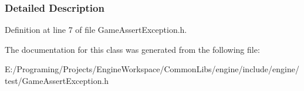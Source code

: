 \subsubsection{Detailed Description}


Definition at line 7 of file Game\+Assert\+Exception.\+h.



The documentation for this class was generated from the following file\+:\begin{DoxyCompactItemize}
\item 
E\+:/\+Programing/\+Projects/\+Engine\+Workspace/\+Common\+Libs/engine/include/engine/test/Game\+Assert\+Exception.\+h\end{DoxyCompactItemize}

